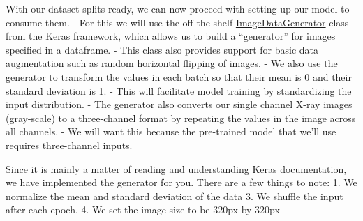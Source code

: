 \documentclass[11pt]{article}
\begin{document}
    With our dataset splits ready, we can now proceed with setting up our
model to consume them. - For this we will use the off-the-shelf
\href{https://keras.io/preprocessing/image/}{ImageDataGenerator} class
from the Keras framework, which allows us to build a ``generator'' for
images specified in a dataframe. - This class also provides support for
basic data augmentation such as random horizontal flipping of images. -
We also use the generator to transform the values in each batch so that
their mean is \(0\) and their standard deviation is 1. - This will
facilitate model training by standardizing the input distribution. - The
generator also converts our single channel X-ray images (gray-scale) to
a three-channel format by repeating the values in the image across all
channels. - We will want this because the pre-trained model that we'll
use requires three-channel inputs.

Since it is mainly a matter of reading and understanding Keras
documentation, we have implemented the generator for you. There are a
few things to note: 1. We normalize the mean and standard deviation of
the data 3. We shuffle the input after each epoch. 4. We set the image
size to be 320px by 320px
\end{document}
